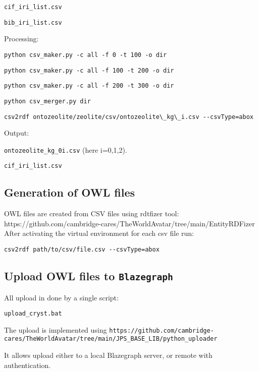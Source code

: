 \documentclass{article}
\begin{document}
\hspace{1cm} \texttt{cif\_iri\_list.csv} 

\hspace{1cm} \texttt{bib\_iri\_list.csv} 


Processing: 

\hspace{1cm} 
\texttt{python csv\_maker.py -c all -f 0 -t 100 -o dir}

\hspace{1cm} 
\texttt{python csv\_maker.py -c all -f 100 -t 200 -o dir}

\hspace{1cm} 
\texttt{python csv\_maker.py -c all -f 200 -t 300 -o dir}

\hspace{1cm} \texttt{python csv\_merger.py dir}

\hspace{1cm} 
\verb|csv2rdf ontozeolite/zeolite/csv/ontozeolite\_kg\_i.csv --csvType=abox|

Output:

\hspace{1cm} %
\texttt{ontozeolite\_kg\_0i.csv} (here i=0,1,2).

\hspace{1cm} %
    \texttt{cif\_iri\_list.csv}

\subsection{Generation of OWL files}

OWL files are created from CSV files using rdtfizer tool: https://github.com/cambridge-cares/TheWorldAvatar/tree/main/EntityRDFizer
After activating the virtual environment for each csv file run:

\verb|csv2rdf path/to/csv/file.csv --csvType=abox |


\subsection{Upload OWL files to \texttt{Blazegraph}}

All upload in done by a single script:

\texttt{upload\_cryst.bat}

The upload is implemented using 
\verb|https://github.com/cambridge-cares/TheWorldAvatar/tree/main/JPS_BASE_LIB/python_uploader|

It allows upload either to a local Blazegraph server, or remote with authentication.
\end{document}
